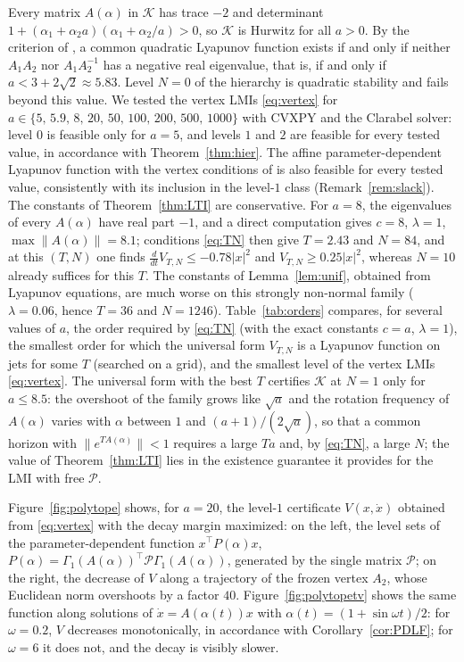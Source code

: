 \documentclass[preprint,12pt,authoryear]{elsarticle}
\theoremstyle{definition}
\theoremstyle{remark}
\newcommand{\tr}{^{\top}}
\newcommand{\PP}{\mathcal{P}}
\newcommand{\KK}{\mathcal{K}}
\begin{document}
Every matrix $A(\alpha)$ in $\KK$ has trace $-2$ and determinant $1+(\alpha_1+\alpha_2a)(\alpha_1+\alpha_2/a)>0$, so $\KK$ is Hurwitz for all $a>0$. By the criterion of \citet{ShortenNarendra2002}, a common quadratic Lyapunov function exists if and only if neither $A_1A_2$ nor $A_1A_2^{-1}$ has a negative real eigenvalue, that is, if and only if $a<3+2\sqrt2\approx5.83$. Level $N=0$ of the hierarchy is quadratic stability and fails beyond this value. We tested the vertex LMIs \eqref{eq:vertex} for $a\in\{5,\,5.9,\,8,\,20,\,50,\,100,\,200,\,500,\,1000\}$ with CVXPY and the Clarabel solver: level $0$ is feasible only for $a=5$, and levels $1$ and $2$ are feasible for every tested value, in accordance with Theorem~\ref{thm:hier}. The affine parameter-dependent Lyapunov function with the vertex conditions of \citet{RamosPeres2002} is also feasible for every tested value, consistently with its inclusion in the level-$1$ class (Remark~\ref{rem:slack}). The constants of Theorem~\ref{thm:LTI} are conservative. For $a=8$, the eigenvalues of every $A(\alpha)$ have real part $-1$, and a direct computation gives $c=8$, $\lambda=1$, $\max\|A(\alpha)\|=8.1$; conditions \eqref{eq:TN} then give $T=2.43$ and $N=84$, and at this $(T,N)$ one finds $\frac{d}{dt}V_{T,N}\le-0.78|x|^2$ and $V_{T,N}\ge0.25|x|^2$, whereas $N=10$ already suffices for this $T$. The constants of Lemma~\ref{lem:unif}, obtained from Lyapunov equations, are much worse on this strongly non-normal family ($\lambda=0.06$, hence $T=36$ and $N=1246$). Table~\ref{tab:orders} compares, for several values of $a$, the order required by \eqref{eq:TN} (with the exact constants $c=a$, $\lambda=1$), the smallest order for which the universal form $V_{T,N}$ is a Lyapunov function on jets for some $T$ (searched on a grid), and the smallest level of the vertex LMIs \eqref{eq:vertex}. The universal form with the best $T$ certifies $\KK$ at $N=1$ only for $a\le8.5$: the overshoot of the family grows like $\sqrt a$ and the rotation frequency of $A(\alpha)$ varies with $\alpha$ between $1$ and $(a+1)/(2\sqrt a)$, so that a common horizon with $\|e^{TA(\alpha)}\|<1$ requires a large $Ta$ and, by \eqref{eq:TN}, a large $N$; the value of Theorem~\ref{thm:LTI} lies in the existence guarantee it provides for the LMI with free $\PP$.

Figure~\ref{fig:polytope} shows, for $a=20$, the level-$1$ certificate $V(x,\dot x)$ obtained from \eqref{eq:vertex} with the decay margin maximized: on the left, the level sets of the parameter-dependent function $x\tr P(\alpha)x$, $P(\alpha)=\Gamma_1(A(\alpha))\tr\PP\Gamma_1(A(\alpha))$, generated by the single matrix $\PP$; on the right, the decrease of $V$ along a trajectory of the frozen vertex $A_2$, whose Euclidean norm overshoots by a factor $40$. Figure~\ref{fig:polytopetv} shows the same function along solutions of $\dot x=A(\alpha(t))x$ with $\alpha(t)=(1+\sin\omega t)/2$: for $\omega=0.2$, $V$ decreases monotonically, in accordance with Corollary~\ref{cor:PDLF}; for $\omega=6$ it does not, and the decay is visibly slower.
\end{document}
